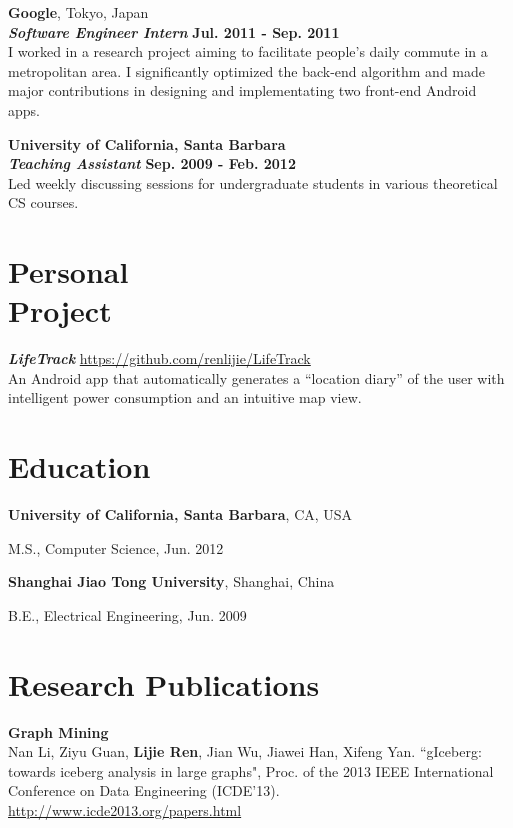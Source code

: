 \documentclass[margin,line]{res}
\newenvironment{list1}{
  \begin{list}{\ding{113}}{%
      \setlength{\itemsep}{0in}
      \setlength{\parsep}{0in} \setlength{\parskip}{0in}
      \setlength{\topsep}{0in} \setlength{\partopsep}{0in}
      \setlength{\leftmargin}{0.17in}}}{\end{list}}
\begin{document}
\begin{resume}
{\bf{Google}}, Tokyo, Japan\\
{\bf{\em Software Engineer Intern}} \hfill {\bf Jul. 2011 - Sep. 2011}\\
I worked in a research project aiming to facilitate people's daily commute in a metropolitan area. I significantly optimized the back-end algorithm and made major contributions in designing and implementating two front-end Android apps.

{\bf{University of California, Santa Barbara}}\\
{\bf{\em Teaching Assistant}} \hfill {\bf Sep. 2009 - Feb. 2012}\\
Led weekly discussing sessions for undergraduate students in various theoretical CS courses.

\section{\sc Personal\\Project}
{\bf{\em LifeTrack}} \hfill \url{https://github.com/renlijie/LifeTrack}\\
An Android app that automatically generates a ``location diary'' of the user with intelligent power consumption and an intuitive map view.

\section{\sc Education}
{\bf University of California, Santa Barbara}, CA, USA\\
\vspace*{-.1in}
\begin{list1}
\item[] M.S., Computer Science, Jun. 2012
\end{list1}

{\bf Shanghai Jiao Tong University}, Shanghai, China\\
\vspace*{-.1in}
\begin{list1}
\item[] B.E., Electrical Engineering, Jun. 2009
\end{list1}

\section{\sc Research Publications}
\vspace{-.1cm}
{\bf Graph Mining}\\
Nan Li, Ziyu Guan, {\bf{Lijie Ren}}, Jian Wu, Jiawei Han, Xifeng Yan. ``gIceberg: towards iceberg analysis in large graphs", Proc. of the 2013 IEEE International Conference on Data Engineering (ICDE'13).\\\url{http://www.icde2013.org/papers.html}


\end{resume}
\end{document}
